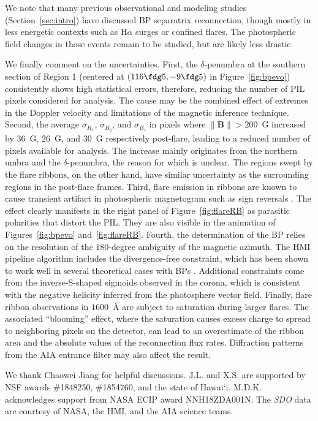 \documentclass[times,twocolumn]{aastex631}
\begin{document}
\begin{CJK*}{UTF8}{gbsn}
We note that many previous observational and modeling studies (Section~\ref{sec:intro}) have discussed BP separatrix reconnection, though mostly in less energetic contexts such as H$\alpha$ surges or confined flares. The photospheric field changes in those events remain to be studied, but are likely less drastic.

We finally comment on the uncertainties. First, the $\delta$-penumbra at the southern section of Region 1 (centered at $(116\fdg5,-9\fdg5)$ in Figure~\ref{fig:bpevo}) consistently shows high statistical errors, therefore, reducing the number of PIL pixels considered for analysis. The cause may be the combined effect of extremes in the Doppler velocity and limitations of the magnetic inference technique. Second, the average $\sigma_{B_x}$, $\sigma_{B_y}$, and $\sigma_{B_z}$ in pixels where $\lVert\bm{B}\rVert>200$~G increased by $36$~G, $26$~G, and $30$~G respectively post-flare, leading to a reduced number of pixels available for analysis. The increase mainly originates from the northern umbra and the $\delta$-penumbra, the reason for which is unclear. The regions swept by the flare ribbons, on the other hand, have similar uncertainty as the surrounding regions in the post-flare frames. Third, flare emission in ribbons are known to cause transient artifact in photospheric magnetogram such as sign reversals \citep{qiu2003,sun2017a}. The effect clearly manifests in the right panel of Figure~\ref{fig:flareRB} as parasitic polarities that distort the PIL. They are also visible in the animation of Figures~\ref{fig:bpevo} and~\ref{fig:flareRB}. Fourth, the determination of the BP relies on the resolution of the $180$-degree ambiguity of the magnetic azimuth. The HMI pipeline algorithm \citep{leka2009} includes the divergence-free constraint, which has been shown to work well in several theoretical cases with BPs \citep{lij2007}. Additional constraints come from the inverse-S-shaped sigmoids observed in the corona, which is consistent with the negative helicity inferred from the photosphere vector field. Finally, flare ribbon observations in $1600$~{\AA} are subject to saturation during larger flares. The associated ``blooming'' effect, where the saturation causes excess charge to spread to neighboring pixels on the detector, can lead to an overestimate of the ribbon area and the absolute values of the reconnection flux rates. Diffraction patterns from the AIA entrance filter may also affect the result.
 


\begin{acknowledgments}
We thank Chaowei Jiang for helpful discussions. J.L. and X.S. are supported by NSF awards \#1848250, \#1854760, and the state of Hawai`i. M.D.K. acknowledges support from NASA ECIP award NNH18ZDA001N. The \textit{SDO} data are courtesy of NASA, the HMI, and the AIA science teams.
\end{acknowledgments}




\end{CJK*}


%


\end{document}
